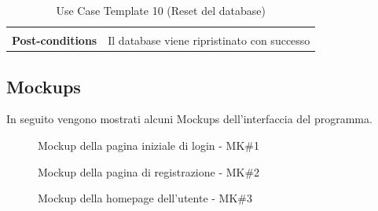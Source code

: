 \documentclass{article}
\begin{document}
\begin{table}
\begin{tabularx}{\textwidth}{|lX|}
\begin{description}[nosep,before=\leavevmode\vspace*{-1\baselineskip},after=\leavevmode\vspace*{-1\baselineskip}]
                                                                    \end{description} \\
                    \rowcolor{white} \textbf{Post-conditions} & Il database viene ripristinato con successo \\
                    \toprule
                \end{tabularx}
                \caption{Use Case Template 10 (Reset del database)}
                \label{tab:use-case-template-10}
            \end{table}
            \clearpage
            


            
            \renewcommand{\arraystretch}{1}

    \vspace{1cm}

\subsection{Mockups}
In seguito vengono mostrati alcuni Mockups dell'interfaccia del programma.

\setlength{\fboxsep}{0pt}
            \begin{figure}[H]
                \centering
                \caption{Mockup della pagina iniziale di login - MK\#1}
                \label{fig:mk.1}
            \end{figure}
            
\setlength{\fboxsep}{0pt}
            \begin{figure}[H]
                \centering
                \caption{Mockup della pagina di registrazione - MK\#2}
                \label{fig:mk.2}
            \end{figure}

\setlength{\fboxsep}{0pt}
            \begin{figure}[H]
                \centering
                \caption{Mockup della homepage dell'utente  - MK\#3}
                \label{fig:mk.3}
            \end{figure}
\end{document}
